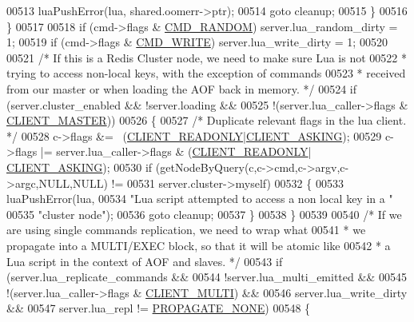 \begin{DoxyCode}
{{{{{{{00513             luaPushError(lua, shared.oomerr->ptr);
00514             \textcolor{keywordflow}{goto} cleanup;
00515         \}
00516     \}
00517 
00518     \textcolor{keywordflow}{if} (cmd->flags & \hyperlink{server_8h_a9f6608fefa355981c2a865ef3d44f196}{CMD\_RANDOM}) server.lua\_random\_dirty = 1;
00519     \textcolor{keywordflow}{if} (cmd->flags & \hyperlink{server_8h_a7391deb9c3a262ded3e186e94eb884e2}{CMD\_WRITE}) server.lua\_write\_dirty = 1;
00520 
00521     \textcolor{comment}{/* If this is a Redis Cluster node, we need to make sure Lua is not}
00522 \textcolor{comment}{     * trying to access non-local keys, with the exception of commands}
00523 \textcolor{comment}{     * received from our master or when loading the AOF back in memory. */}
00524     \textcolor{keywordflow}{if} (server.cluster\_enabled && !server.loading &&
00525         !(server.lua\_caller->flags & \hyperlink{server_8h_a3d8f0cc8d0653ee2b6dafb454292c069}{CLIENT\_MASTER}))
00526     \{
00527         \textcolor{comment}{/* Duplicate relevant flags in the lua client. */}
00528         c->flags &= ~(\hyperlink{server_8h_a84ba0494755e2f4f0faf6017175b5e0a}{CLIENT\_READONLY}|\hyperlink{server_8h_a108ac316dfd847430daf3c97f28557d3}{CLIENT\_ASKING});
00529         c->flags |= server.lua\_caller->flags & (\hyperlink{server_8h_a84ba0494755e2f4f0faf6017175b5e0a}{CLIENT\_READONLY}|
      \hyperlink{server_8h_a108ac316dfd847430daf3c97f28557d3}{CLIENT\_ASKING});
00530         \textcolor{keywordflow}{if} (getNodeByQuery(c,c->cmd,c->argv,c->argc,NULL,NULL) !=
00531                            server.cluster->myself)
00532         \{
00533             luaPushError(lua,
00534                 \textcolor{stringliteral}{"Lua script attempted to access a non local key in a "}
00535                 \textcolor{stringliteral}{"cluster node"});
00536             \textcolor{keywordflow}{goto} cleanup;
00537         \}
00538     \}
00539 
00540     \textcolor{comment}{/* If we are using single commands replication, we need to wrap what}
00541 \textcolor{comment}{     * we propagate into a MULTI/EXEC block, so that it will be atomic like}
00542 \textcolor{comment}{     * a Lua script in the context of AOF and slaves. */}
00543     \textcolor{keywordflow}{if} (server.lua\_replicate\_commands &&
00544         !server.lua\_multi\_emitted &&
00545         !(server.lua\_caller->flags & \hyperlink{server_8h_a7f61f783f429419f8c593291a509b03a}{CLIENT\_MULTI}) &&
00546         server.lua\_write\_dirty &&
00547         server.lua\_repl != \hyperlink{server_8h_a0c7409da047d754c0adeb001025acc03}{PROPAGATE\_NONE})
00548     \{
}}}}}}}
\end{DoxyCode}
